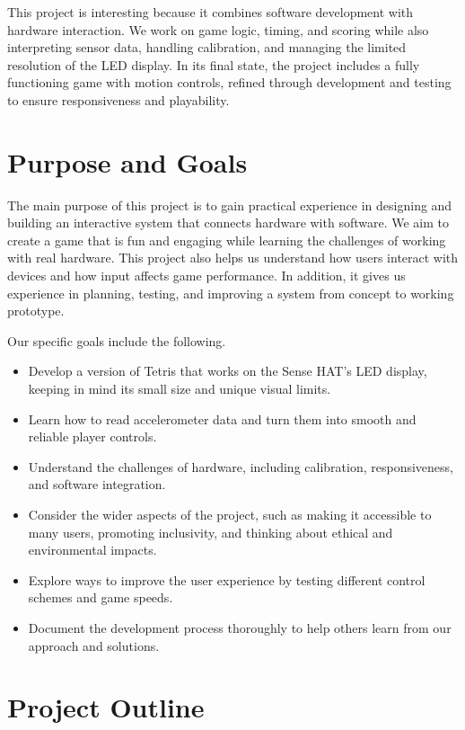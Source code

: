 \documentclass[12pt]{report}
\begin{document}
This project is interesting because it combines software development with hardware interaction. We work on game logic, timing, and scoring while also interpreting sensor data, handling calibration, and managing the limited resolution of the LED display. In its final state, the project includes a fully functioning game with motion controls, refined through development and testing to ensure responsiveness and playability.


\section{Purpose and Goals}
\label{sec:thesis-outline}
The main purpose of this project is to gain practical experience in designing and building an interactive system that connects hardware with software. We aim to create a game that is fun and engaging while learning the challenges of working with real hardware. This project also helps us understand how users interact with devices and how input affects game performance. In addition, it gives us experience in planning, testing, and improving a system from concept to working prototype. 

Our specific goals include the following.

\begin{itemize}
\item Develop a version of Tetris that works on the Sense HAT’s LED display, keeping in mind its small size and unique visual limits.
\item Learn how to read accelerometer data and turn them into smooth and reliable player controls.
\item Understand the challenges of hardware, including calibration, responsiveness, and software integration.
\item Consider the wider aspects of the project, such as making it accessible to many users, promoting inclusivity, and thinking about ethical and environmental impacts.
\item Explore ways to improve the user experience by testing different control schemes and game speeds.
\item Document the development process thoroughly to help others learn from our approach and solutions.
\end{itemize}


\section{Project Outline}
\end{document}

